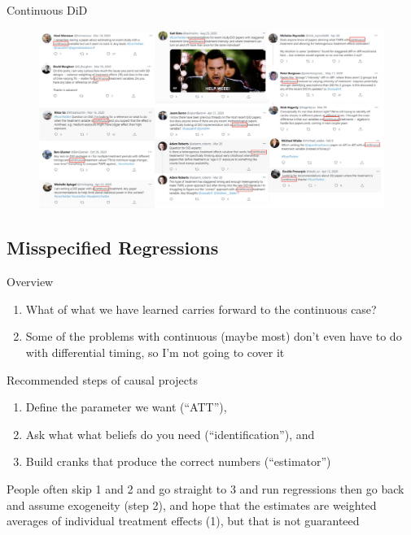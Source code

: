 \documentclass{beamer}
\begin{document}
\begin{frame}{Continuous DiD}

\begin{figure}
\begin{center}
             \includegraphics[scale=0.4]{./lecture_includes/continuous_did_image}
\end{center}
\end{figure}

\end{frame}

\subsection{Misspecified Regressions}


\begin{frame}{Overview}

\begin{enumerate}
\item What of what we have learned carries forward to the continuous case?
\item Some of the problems with continuous (maybe most) don't even have to do with differential timing, so I'm not going to cover it
\end{enumerate}

\end{frame}

\begin{frame}{Recommended steps of causal projects}

\begin{enumerate}
\item Define the parameter we want (``ATT''), 
\item Ask what what beliefs do you need (``identification''), and 
\item Build cranks that produce the correct numbers (``estimator'')
\end{enumerate}

\bigskip

People often skip 1 and 2 and go straight to 3 and run regressions then go back and assume exogeneity (step 2), and hope that the estimates are weighted averages of individual treatment effects (1), but that is not guaranteed

\end{frame}
\end{document}
